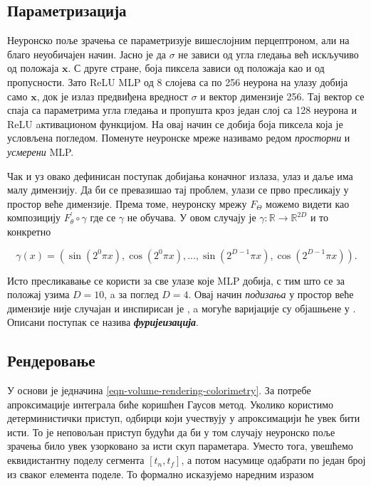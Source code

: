 \documentclass[12pt, a4paper, twoside]{book}
\numberwithin{equation}{chapter}
\numberwithin{theorem}{section}
\numberwithin{definition}{section}
\numberwithin{definitionChapter}{chapter}
\begin{document}
\subsection{Параметризација}
Неуронско поље зрачења се параметризује вишеслојним перцептроном, али на благо неуобичајен начин. Јасно је да $\sigma$
не зависи од угла гледања већ искључиво од положаја $\mathbf{x}$. С друге стране, боја пиксела зависи од положаја
као и од пропусности. Зато ReLU MLP од 8 слојева са по 256 неурона на улазу добија само $\mathbf{x}$, док је излаз
предвиђена вредност $\sigma$ и вектор димензије 256. Тај вектор се спаја са параметрима угла гледања и пропушта
кроз један слој са 128 неурона и ReLU aктивационом функцијом. На овај начин се добија боја пиксела која је 
условљена погледом. Поменуте неуронске мреже називамо редом \textit{просторни} и \textit{усмерени} MLP.

Чак и уз овако дефинисан поступак добијања коначног излаза, улаз и даље има малу димензију. Да би се превазишао
тај проблем, улази се прво пресликају у простор веће димензије. Према томе, неуронску мрежу $F_\Theta$ можемо
видети као композицију $F_\theta^\prime \circ \gamma$ где се $\gamma$ не обучава. У овом случају је
$\gamma : \mathbb{R} \rightarrow \mathbb{R}^{2D}$ и то конкретно

\begin{equation}
	\gamma(x) = (\sin(2^0\pi x), \cos(2^0 \pi x), ..., \sin(2^{D-1}\pi x), \cos(2^{D-1}\pi x)).
	\label{eqn-fourier-features}
\end{equation}

Исто пресликавање се користи за све улазе које MLP добија, с тим што се за положај узима $D=10$, a за поглед $D=4$.
Овај начин \textit{подизања} у простор веће димензије није случајан и инспирисан је \cite{transformer}, a могуће
варијације су објашњене у \cite{fourier-coefficients}. Описани поступак се назива \textbf{\textit{фуријеизација}}.

\subsection{Рендеровање}
У основи је једначина \ref{eqn-volume-rendering-colorimetry}. За потребе апроксимације интеграла биће коришћен
Гаусов метод. Уколико користимо детерминистички приступ, одбирци који учествују у апроксимацији ће увек бити исти.
То је неповољан приступ будући да би у том случају неуронско поље зрачења било увек узорковано за исти скуп
параметара. Уместо тога, увешћемо еквидистантну поделу сегмента $\left[t_n, t_f\right]$, а потом насумице
одабрати по један број из сваког елемента поделе. То формално исказујемо наредним изразом
\end{document}
